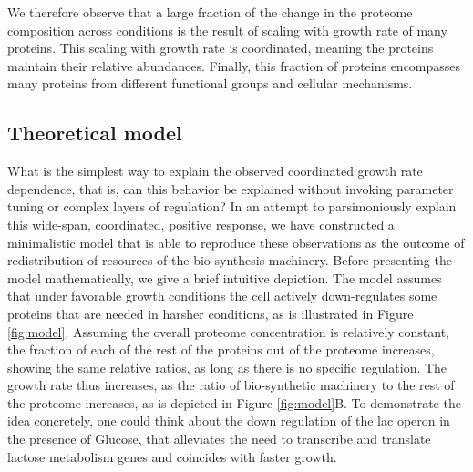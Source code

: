 \documentclass[notitlepage]{article}
\begin{document}
We therefore observe that a large fraction of the change in the proteome composition across conditions is the result of scaling with growth rate of many proteins.
This scaling with growth rate is coordinated, meaning the proteins maintain their relative abundances.
Finally, this fraction of proteins encompasses many proteins from different functional groups and cellular mechanisms.

\subsection{Theoretical model}
What is the simplest way to explain the observed coordinated growth rate dependence, that is, can this behavior be explained without invoking parameter tuning or complex layers of regulation?
In an attempt to parsimoniously explain this wide-span, coordinated, positive response, we have constructed a minimalistic model that is able to reproduce these observations as the outcome of redistribution of resources of the bio-synthesis machinery.
Before presenting the model mathematically, we give a brief intuitive depiction.
The model assumes that under favorable growth conditions the cell actively down-regulates some proteins that are needed in harsher conditions, as is illustrated in Figure \ref{fig:model}.
Assuming the overall proteome concentration is relatively constant, the fraction of each of the rest of the proteins out of the proteome increases, showing the same relative ratios, as long as there is no specific regulation.
The growth rate thus increases, as the ratio of bio-synthetic machinery to the rest of the proteome increases, as is depicted in Figure \ref{fig:model}B.
To demonstrate the idea concretely, one could think about the down regulation of the lac operon in the presence of Glucose, that alleviates the need to transcribe and translate lactose metabolism genes and coincides with faster growth.
\end{document}
